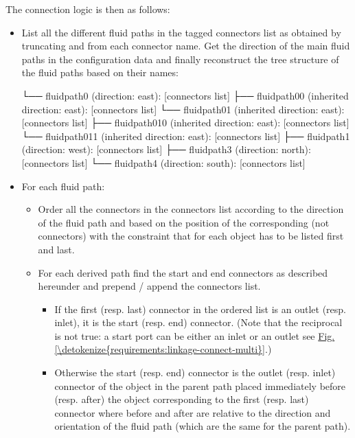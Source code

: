 \documentclass[letterpaper,10pt, openany,english]{sphinxmanual}
\begin{document}
The connection logic is then as follows:
\begin{itemize}
\item {} 
List all the different fluid paths in the tagged connectors list as obtained by truncating  and  from each connector name. Get the direction of the main fluid paths in the configuration data and finally reconstruct the tree structure of the fluid paths based on their names:

\begin{sphinxVerbatim}[commandchars=\\\{\}]
└── fluid\PYGZus{}path0 (direction: east): [connectors list]
  ├── fluid\PYGZus{}path0\PYGZus{}0 (inherited direction: east): [connectors list]
  └── fluid\PYGZus{}path0\PYGZus{}1 (inherited direction: east): [connectors list]
    ├── fluid\PYGZus{}path0\PYGZus{}1\PYGZus{}0 (inherited direction: east): [connectors list]
    └── fluid\PYGZus{}path0\PYGZus{}1\PYGZus{}1 (inherited direction: east): [connectors list]
├── fluid\PYGZus{}path1 (direction: west): [connectors list]
├── fluid\PYGZus{}path3 (direction: north): [connectors list]
└── fluid\PYGZus{}path4 (direction: south): [connectors list]
\end{sphinxVerbatim}

\item {} 
For each fluid path:
\begin{itemize}
\item {} 
Order all the connectors in the connectors list according to the direction of the fluid path and based on the position of the corresponding  (not connectors) with the constraint that for each object  has to be listed first and  last.

\item {} 
For each derived path find the start and end connectors as described hereunder and prepend / append the connectors list.
\begin{itemize}
\item {} 
If the first (resp. last) connector in the ordered list is an outlet (resp. inlet), it is the start (resp. end) connector. (Note that the reciprocal is not true: a start port can be either an inlet or an outlet see \hyperref[\detokenize{requirements:linkage-connect-multi}]{Fig.\@ \ref{\detokenize{requirements:linkage-connect-multi}}}.)

\item {} 
Otherwise the start (resp. end) connector is the outlet (resp. inlet) connector of the object in the parent path placed immediately before (resp. after) the object corresponding to the first (resp. last) connector \textendash{} where before and after are relative to the direction and orientation of the fluid path (which are the same for the parent path).


\end{itemize}
\end{itemize}
\end{itemize}
\end{document}
